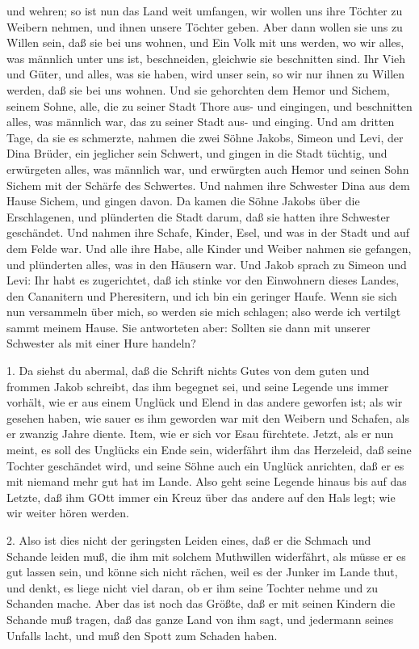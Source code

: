 \begin{schriftzitat}
und wehren; so ist nun das Land weit umfangen, wir wollen uns ihre Töchter zu Weibern nehmen, und ihnen unsere Töchter geben. Aber dann wollen sie uns zu Willen sein, daß sie bei uns wohnen, und Ein Volk mit uns werden, wo wir alles, was männlich unter uns ist, beschneiden, gleichwie sie beschnitten sind. Ihr Vieh und Güter, und alles, was sie haben, wird unser sein, so wir nur ihnen zu Willen werden, daß sie bei uns wohnen. Und sie gehorchten dem Hemor und Sichem, seinem Sohne, alle, die zu seiner Stadt Thore aus- und eingingen, und beschnitten alles, was männlich war, das zu seiner Stadt aus- und einging. Und am dritten Tage, da sie es schmerzte, nahmen die zwei Söhne Jakobs, Simeon und Levi, der Dina Brüder, ein jeglicher sein Schwert, und gingen in die Stadt tüchtig, und erwürgeten alles, was männlich war, und erwürgten auch Hemor und seinen Sohn Sichem mit der Schärfe des Schwertes. Und nahmen ihre Schwester Dina aus dem Hause Sichem, und gingen davon. Da kamen die Söhne Jakobs über die Erschlagenen, und plünderten die Stadt darum, daß sie hatten ihre Schwester geschändet. Und nahmen ihre Schafe, Kinder, Esel, und was in der Stadt und auf dem Felde war. Und alle ihre Habe, alle Kinder und Weiber nahmen sie gefangen, und plünderten alles, was in den Häusern war. Und Jakob sprach zu Simeon und Levi: Ihr habt es zugerichtet, daß ich stinke vor den Einwohnern dieses Landes, den Cananitern und Pheresitern, und ich bin ein geringer Haufe. Wenn sie sich nun versammeln über mich, so werden sie mich schlagen; also werde ich vertilgt sammt meinem Hause. Sie antworteten aber: Sollten sie dann mit unserer Schwester als mit einer Hure handeln?
\end{schriftzitat}

1. Da siehst du abermal, daß die Schrift nichts Gutes von dem guten und frommen Jakob schreibt, das ihm begegnet sei, und seine Legende uns immer vorhält, wie er aus einem Unglück und Elend in das andere geworfen ist; als wir gesehen haben, wie sauer es ihm geworden war mit den Weibern und Schafen, als er zwanzig Jahre diente. Item, wie er sich vor Esau fürchtete. Jetzt, als er nun meint, es soll des Unglücks ein Ende sein, widerfährt ihm das Herzeleid, daß seine Tochter geschändet wird, und seine Söhne auch ein Unglück anrichten, daß er es mit niemand mehr gut hat im Lande. Also geht seine Legende hinaus bis auf das Letzte, daß ihm GOtt immer ein Kreuz über das andere auf den Hals legt; wie wir weiter hören werden.

2. Also ist dies nicht der geringsten Leiden eines, daß er die Schmach und Schande leiden muß, die ihm mit solchem Muthwillen widerfährt, als müsse er es gut lassen sein, und könne sich nicht rächen, weil es der Junker im Lande thut, und denkt, es liege nicht viel daran, ob er ihm seine Tochter nehme und zu Schanden mache. Aber das ist noch das Größte, daß er mit seinen Kindern die Schande muß tragen, daß das ganze Land von ihm sagt, und jedermann seines Unfalls lacht, und muß den Spott zum Schaden haben.

